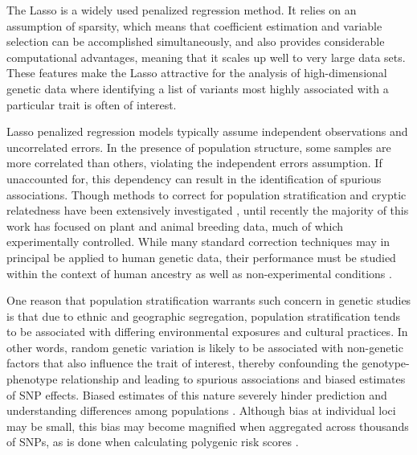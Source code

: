 The Lasso \citep{tibshirani1996regression} is a widely used penalized regression method. It relies on an assumption of sparsity, which means that coefficient estimation and variable selection can be accomplished simultaneously, and also provides considerable computational advantages, meaning that it scales up well to very large data sets. These features make the Lasso attractive for the analysis of high-dimensional genetic data where identifying a list of variants most highly associated with a particular trait is often of interest.

Lasso penalized regression models typically assume independent observations and uncorrelated errors. In the presence of population structure, some samples are more correlated than others, violating the independent errors assumption. If unaccounted for, this dependency can result in the identification of spurious associations. Though methods to correct for population stratification and cryptic relatedness have been extensively investigated \citep{Amin2007, hoffman2013correcting, price2006principal, Rakitsch2012, bhatnagar2019simultaneous, Sillanpaeae2011}, until recently the majority of this work has focused on plant and animal breeding data, much of which experimentally controlled. While many standard correction techniques may in principal be applied to human genetic data, their performance must be studied within the context of human ancestry as well as non-experimental conditions \citep{lawson2019population, barton2019population}.  

One reason that population stratification warrants such concern in genetic studies is that due to ethnic and geographic segregation, population stratification tends to be associated with differing environmental exposures and cultural practices.  In other words, random genetic variation is likely to be associated with non-genetic factors that also influence the trait of interest, thereby confounding the genotype-phenotype relationship and leading to spurious associations and biased estimates of SNP effects. Biased estimates of this nature severely hinder prediction and understanding differences among populations \citep{barton2019population}. Although bias at individual loci may be small, this bias may become magnified when aggregated across thousands of SNPs, as is done when calculating polygenic risk scores \citep{barton2019population}.


